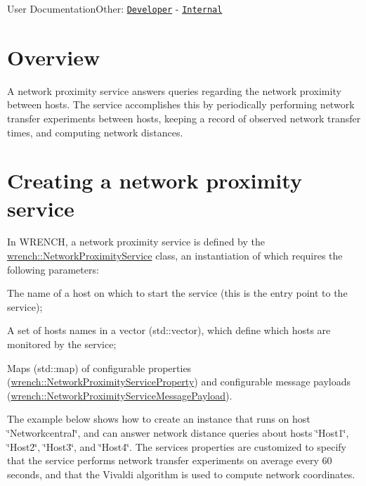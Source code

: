 User DocumentationOther\+: \href{../developer/guide-networkproximity.html}{\tt Developer} -\/ \href{../internal/guide-networkproximity.html}{\tt Internal}\hypertarget{guide-networkproximity_guide-networkproximity-overview}{}\section{Overview}\label{guide-networkproximity_guide-networkproximity-overview}
A network proximity service answers queries regarding the network proximity between hosts. The service accomplishes this by periodically performing network transfer experiments between hosts, keeping a record of observed network transfer times, and computing network distances.\hypertarget{guide-networkproximity_guide-networkproximity-creating}{}\section{Creating a network proximity service}\label{guide-networkproximity_guide-networkproximity-creating}
In W\+R\+E\+N\+CH, a network proximity service is defined by the {\ttfamily \hyperlink{classwrench_1_1_network_proximity_service}{wrench\+::\+Network\+Proximity\+Service}} class, an instantiation of which requires the following parameters\+:


\begin{DoxyItemize}
\item The name of a host on which to start the service (this is the entry point to the service);
\item A set of hosts names in a vector ({\ttfamily std\+::vector}), which define which hosts are monitored by the service;
\item Maps ({\ttfamily std\+::map}) of configurable properties ({\ttfamily \hyperlink{classwrench_1_1_network_proximity_service_property}{wrench\+::\+Network\+Proximity\+Service\+Property}}) and configurable message payloads ({\ttfamily \hyperlink{classwrench_1_1_network_proximity_service_message_payload}{wrench\+::\+Network\+Proximity\+Service\+Message\+Payload}}).
\end{DoxyItemize}

The example below shows how to create an instance that runs on host \char`\"{}\+Networkcentral\char`\"{}, and can answer network distance queries about hosts \char`\"{}\+Host1\char`\"{}, \char`\"{}\+Host2\char`\"{}, \char`\"{}\+Host3\char`\"{}, and \char`\"{}\+Host4\char`\"{}. The service\textquotesingle{}s properties are customized to specify that the service performs network transfer experiments on average every 60 seconds, and that the Vivaldi algorithm is used to compute network coordinates.


